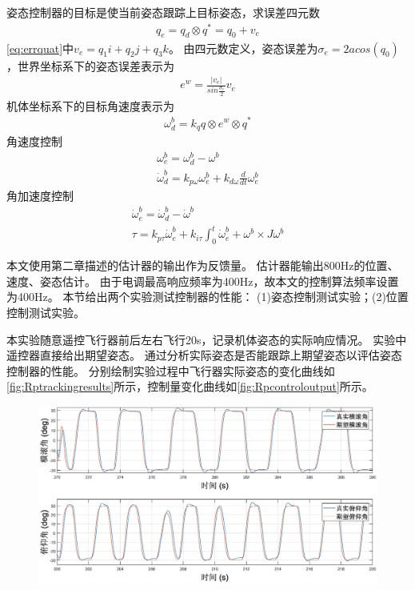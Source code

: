 \documentclass[
  type=master
]{gdutthesis}
\begin{document}
姿态控制器的目标是使当前姿态跟踪上目标姿态，求误差四元数\vspace{1ex}
\begin{gather}\label{eq:errquat}
	q_e = q_d \otimes q^{*} = q_0 + v_e
\end{gather}
\autoref{eq:errquat}中$v_e = q_1 i + q_2 j + q_3 k$。
由四元数定义，姿态误差为$\sigma_e = 2acos(q_0)$，世界坐标系下的姿态误差表示为
\begin{gather}
	e^w = \frac{\left| v_e \right|}{sin\frac{\sigma_e}{2}} v_e
\end{gather}
机体坐标系下的目标角速度表示为
\begin{gather}
	\omega^b_d = k_q q \otimes e^w \otimes q^{*}
\end{gather}
角速度控制
\begin{gather}\label{eq:angularacontrol}
	\omega^b_e = \omega^b_d - \omega^b\\
	\dot{\omega}^b_d = k_{p \omega} \omega^b_e + k_{d \omega} \frac{d}{dt}\omega^b_e
\end{gather}
角加速度控制
\begin{gather}\label{eq:angularaccelerationcontrol}
		\dot{\omega}^b_e = \dot{\omega}^b_d - \dot{\omega}^b\\
		\tau = k_{p \tau} \dot{\omega}^b_e + k_{i \tau} \int_{0}^{t}\dot{\omega}^b_e + \omega^b \times J \omega^b
\end{gather}

本文使用第二章描述的估计器的输出作为反馈量。
估计器能输出800Hz的位置、速度、姿态估计。
由于电调最高响应频率为400Hz，故本文的控制算法频率设置为400Hz。
本节给出两个实验测试控制器的性能：
(1)姿态控制测试实验；(2)位置控制测试实验。

本实验随意遥控飞行器前后左右飞行20s，记录机体姿态的实际响应情况。
实验中遥控器直接给出期望姿态。
通过分析实际姿态是否能跟踪上期望姿态以评估姿态控制器的性能。
分别绘制实验过程中飞行器实际姿态的变化曲线如\autoref{fig:Rptrackingresults}所示，控制量变化曲线如\autoref{fig:Rpcontroloutput}所示。
\begin{figure}[H]
	\centering
	\includegraphics[width=1.0\textwidth]{rpcontrol.eps}
	\label{fig:Rptrackingresults}
\end{figure}
\end{document}
